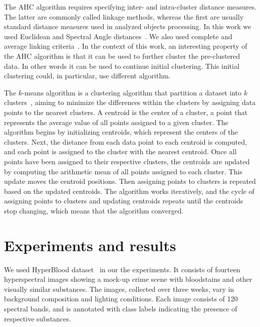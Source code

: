 \documentclass[runningheads]{llncs}
\begin{document}
The AHC  algorithm requires specifying inter- and intra-cluster distance
measures. The latter are commonly called linkage methods, whereas the first are
usually standard distance measures used in analyzed objects processing. In this
work we used Euclidean and Spectral Angle distances~\cite{Sinaice2022}. We also
used complete and average linking criteria~\cite{Bratchell1989}. In
the context of this work, an interesting property of the AHC algorithm is that
it can be used to further cluster the pre-clustered data. In other words it can
be used to continue initial clustering. This initial clustering could, in
particular, use different algorithm.

The $k$-means algorithm is a clustering algorithm that partition a dataset into
$k$ clusters~\cite{Bindra2017}, aiming to minimize the differences within the
clusters by assigning data points to the nearest clusters. A centroid is the
center of a cluster, a point that represents the average value of all points
assigned to a given cluster. The algorithm begins by initializing centroids,
which represent the centers of the clusters. Next, the distance from each data
point to each centroid is computed, and each point is assigned to the cluster
with the nearest centroid. Once all points have been assigned to their
respective clusters, the centroids are updated by computing the arithmetic mean
of all points assigned to each cluster. This update moves the centroid
positions. Then assigning points to clusters is repeated based on the updated
centroids. The algorithm works iteratively, and the cycle of assigning points to
clusters and updating centroids repeats until the centroids stop changing, which
means that the algorithm converged.


\section{Experiments and results}
\label{sec:exp}

We used HyperBlood dataset~\cite{Romaszewski2021} in our the experiments. It
consists of fourteen hyperspectral images showing a mock-up crime scene with
bloodstains and other visually similar substances. The images, collected over
three weeks, vary in background composition and lighting conditions. Each image
consists of 120 spectral bands, and is annotated with class labels indicating
the presence of respective substances. 
\end{document}

